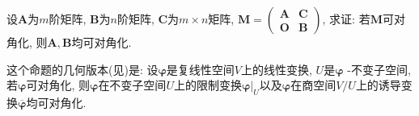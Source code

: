 \documentclass[../../main.tex]{subfiles}%
\begin{document}
\begin{proposition}\label{proposition:没有公共的特征值的可对角化矩阵的分块也可对角化 逆命题}
设\(\boldsymbol{A}\)为\(m\)阶矩阵, \(\boldsymbol{B}\)为\(n\)阶矩阵, \(\boldsymbol{C}\)为\(m\times n\)矩阵, \(\boldsymbol{M} = \begin{pmatrix}
\boldsymbol{A}&\boldsymbol{C}\\
\boldsymbol{O}&\boldsymbol{B}
\end{pmatrix}\), 求证: 若\(\boldsymbol{M}\)可对角化, 则\(\boldsymbol{A},\boldsymbol{B}\)均可对角化.
\end{proposition}
\begin{remark}
这个命题的几何版本(见)是: 设\(\boldsymbol{\varphi}\)是复线性空间\(V\)上的线性变换, \(U\)是\(\boldsymbol{\varphi}\) -不变子空间, 若\(\boldsymbol{\varphi}\)可对角化, 则\(\boldsymbol{\varphi}\)在不变子空间\(U\)上的限制变换\(\boldsymbol{\varphi}|_U\)以及\(\boldsymbol{\varphi}\)在商空间\(V/U\)上的诱导变换\(\overline{\boldsymbol{\varphi}}\)均可对角化. 
\end{remark}
\end{document}
